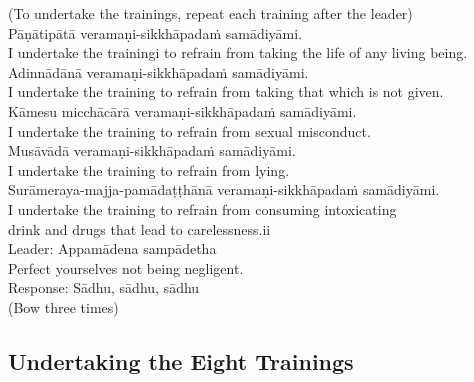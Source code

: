 (To undertake the trainings, repeat each training after the leader)\\
Pāṇātipātā veramaṇi-sikkhāpadaṁ samādiyāmi.\\
I undertake the trainingi to refrain from taking the life of any living being.\\
Adinnādānā veramaṇi-sikkhāpadaṁ samādiyāmi.\\
I undertake the training to refrain from taking that which is not given.\\
Kāmesu micchācārā veramaṇi-sikkhāpadaṁ samādiyāmi.\\
I undertake the training to refrain from sexual misconduct.\\
Musāvādā veramaṇi-sikkhāpadaṁ samādiyāmi.\\
I undertake the training to refrain from lying.\\
Surāmeraya-majja-pamādaṭṭhānā veramaṇi-sikkhāpadaṁ samādiyāmi.\\
I undertake the training to refrain from consuming intoxicating\\
drink and drugs that lead to carelessness.ii\\
Leader: Appamādena sampādetha\\
Perfect yourselves not being negligent.\\
Response: Sādhu, sādhu, sādhu\\

(Bow three times)\\

\subsection{Undertaking the Eight Trainings}

